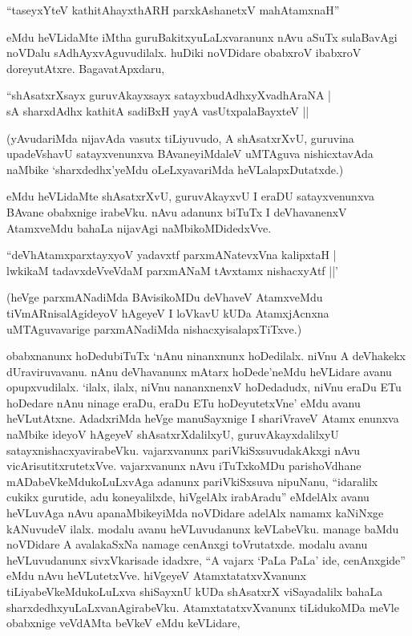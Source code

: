\begin{shloka}
``taseyxYteV kathitAhayxthARH parxkAshanetxV mahAtamxnaH''
\end{shloka}

\noindent eMdu heVLidaMte iMtha guruBakitxyuLaLxvaranunx nAvu aSuTx sulaBavAgi noVDalu sAdhAyxvAguvudilalx. huDiki noVDidare obabxroV ibabxroV doreyutAtxre. BagavatApxdaru,

\begin{shloka}
``shAsatxrXsayx guruvAkayxsayx satayxbudAdhxyXvadhAraNA |\\
sA sharxdAdhx kathitA sadiBxH yayA vasUtxpalaBayxteV ||
\end{shloka}

(yAvudariMda nijavAda vasutx tiLiyuvudo, A shAsatxrXvU, guruvina upadeVshavU satayxvenunxva BAvaneyiMdaleV uMTAguva nishicxtavAda naMbike `sharxdedhx'yeMdu oLeLxyavariMda heVLalapxDutatxde.)

eMdu heVLidaMte shAsatxrXvU, guruvAkayxvU I eraDU satayxvenunxva BAvane obabxnige irabeVku. nAvu adanunx biTuTx I deVhavanenxV AtamxveMdu bahaLa nijavAgi naMbikoMDidedxVve.

\begin{shloka}
``deVhAtamxparxtayxyoV yadavxtf parxmANatevxVna kalipxtaH |\\
lwkikaM tadavxdeVveVdaM parxmANaM tAvxtamx nishacxyAtf ||'
\end{shloka}

(heVge parxmANadiMda BAvisikoMDu deVhaveV AtamxveMdu tiVmARnisalAgideyoV hAgeyeV I loVkavU kUDa AtamxjAcnxna uMTAguvavarige parxmANadiMda nishacxyisalapxTiTxve.)

obabxnanunx hoDedubiTuTx `nAnu ninanxnunx hoDedilalx. niVnu A deVhakekx dUraviruvavanu. nAnu deVhavanunx mAtarx hoDede'neMdu heVLidare avanu opupxvudilalx. `ilalx, ilalx, niVnu nananxnenxV hoDedadudx, niVnu eraDu ETu hoDedare nAnu ninage eraDu, eraDu ETu hoDeyutetxVne' eMdu avanu heVLutAtxne. AdadxriMda heVge manuSayxnige I shariVraveV Atamx enunxva naMbike ideyoV hAgeyeV shAsatxrXdalilxyU, guruvAkayxdalilxyU satayxnishacxyavirabeVku. vajarxvanunx pariVkiSxsuvudakAkxgi nAvu vicArisutitxrutetxVve. vajarxvanunx nAvu iTuTxkoMDu parishoVdhane mADabeVkeMdukoLuLxvAga adanunx pariVkiSxsuva nipuNanu, ``idaralilx cukikx gurutide, adu koneyalilxde, hiVgelAlx irabAradu'' eMdelAlx avanu heVLuvAga nAvu apanaMbikeyiMda noVDidare adelAlx namamx kaNiNxge kANuvudeV ilalx. modalu avanu heVLuvudanunx keVLabeVku. manage baMdu noVDidare A avalakaSxNa namage cenAnxgi toVrutatxde. modalu avanu heVLuvudanunx sivxVkarisade idadxre, ``A vajarx `PaLa PaLa' ide, cenAnxgide'' eMdu nAvu heVLutetxVve. hiVgeyeV AtamxtatatxvXvanunx tiLiyabeVkeMdukoLuLxva shiSayxnU kUDa shAsatxrX viSayadalilx bahaLa sharxdedhxyuLaLxvanAgirabeVku. AtamxtatatxvXvanunx tiLidukoMDa meVle obabxnige veVdAMta beVkeV eMdu keVLidare,


